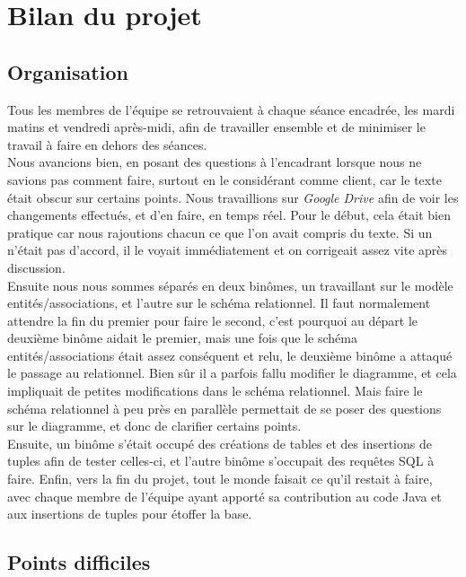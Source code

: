 \documentclass[10pt]{article}
\begin{document}
\section{Bilan du projet}

\subsection{Organisation}

Tous les membres de l'équipe se retrouvaient à chaque séance encadrée, les mardi matins et vendredi après-midi, afin de travailler 
ensemble et de minimiser le travail à faire en dehors des séances.\\

Nous avancions bien, en posant des questions à l'encadrant lorsque nous ne savions pas comment faire, surtout en le considérant comme
client, car le texte était obscur sur certains points. 
Nous travaillions sur \emph{Google Drive} afin de voir les changements effectués, et d'en faire, en temps réel. Pour le début, cela était
bien pratique car nous rajoutions chacun ce que l'on avait compris du texte. Si un n'était pas d'accord, il le voyait immédiatement et
on corrigeait assez vite après discussion. \\

Ensuite nous nous sommes séparés en deux binômes, un travaillant sur le modèle entités/associations, et l'autre sur le schéma relationnel.
Il faut normalement attendre la fin du premier pour faire le second, c'est pourquoi au départ le deuxième binôme aidait le premier, mais
une fois que le schéma entités/associations était assez conséquent et relu, le deuxième binôme a attaqué le passage au relationnel.
Bien sûr il a parfois fallu modifier le diagramme, et cela impliquait de petites modifications dans le schéma relationnel. Mais faire
le schéma relationnel à peu près en parallèle permettait de se poser des questions sur le diagramme, et donc de clarifier certains
points.\\

Ensuite, un binôme s'était occupé des créations de tables et des insertions de tuples afin de tester celles-ci, et l'autre binôme 
s'occupait des requêtes SQL à faire. Enfin, vers la fin du projet, tout le monde faisait ce qu'il restait à faire, avec chaque membre
de l'équipe ayant apporté sa contribution au code Java et aux insertions de tuples pour étoffer la base.

\subsection{Points difficiles}
\end{document}
